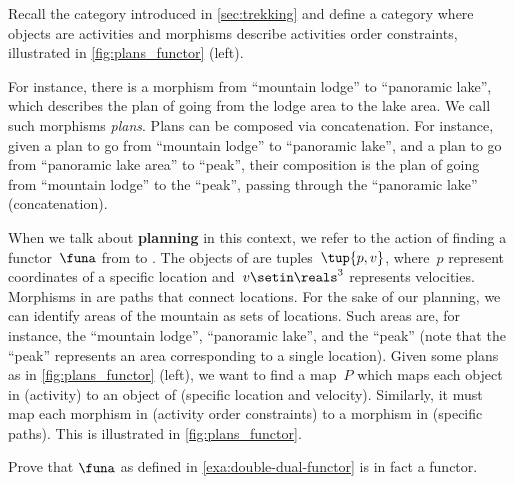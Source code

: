 \begin{example}
    \label{ex:planning-as-search-functor}
    Recall the category \Berg introduced in \cref{sec:trekking} and define a category \Plans where objects are activities and morphisms describe activities order constraints, illustrated in \cref{fig:plans_functor} (left).

    For instance, there is a morphism from ``mountain lodge'' to ``panoramic lake'', which describes the plan of going from the lodge area to the lake area.
    We call such morphisms \emph{plans}.
    Plans can be composed via concatenation.
    For instance, given a plan to go from ``mountain lodge'' to ``panoramic lake'', and a plan to go from ``panoramic lake area'' to ``peak'', their composition is the plan of going from ``mountain lodge'' to the ``peak'', passing through the ``panoramic lake'' (concatenation).

    When we talk about \textbf{planning} in this context, we refer to the action of finding a functor~$\funa$ from \Plans to \Berg.
    The objects of \Berg are tuples~$\tup{p,v}$, where~$p$ represent coordinates of a specific location and~$v\setin \reals^3$ represents velocities.
    Morphisms in \Berg are paths that connect locations.
    For the sake of our planning, we can identify areas of the mountain as sets of locations.
    Such areas are, for instance, the ``mountain lodge'', ``panoramic lake'', and the
    ``peak'' (note that the ``peak'' represents an area corresponding to a single location).
    Given some plans as in \cref{fig:plans_functor} (left), we want to find a map~$P$ which maps each object in \Plans (activity) to an object of \Berg (specific location and velocity).
    Similarly, it must map each morphism in \Plans (activity order constraints) to a morphism in \Berg (specific paths).
    This is illustrated in \cref{fig:plans_functor}.
\end{example}

\begin{figure*}[h!]
    \centering
    \caption{Planning functor.}
    \label{fig:plans_functor}
\end{figure*}

\vfill
\clearpage
\vfill

\begin{gradedexercise}
    \label{ex:DoubleDualFunctor}
    Prove that $\funa$ as defined in \cref{exa:double-dual-functor} is in fact a functor.
\end{gradedexercise}

